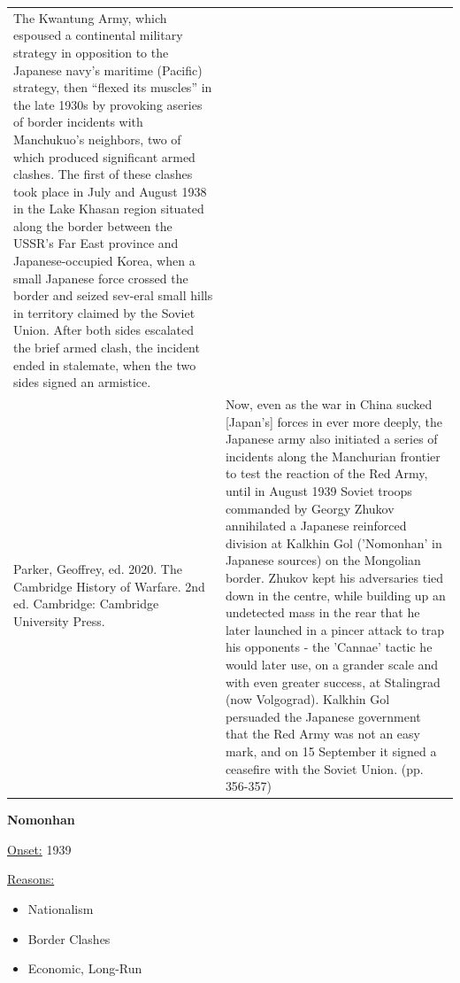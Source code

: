 {\begin{longtable}{p{}p{}}
The Kwantung Army, which espoused a continental military strategy in opposition to the Japanese navy's maritime (Pacific) strategy, then “flexed its muscles” in the late 1930s by provoking aseries of border incidents with Manchukuo's neighbors, two of which produced significant armed clashes. The first of these clashes took place in July and August 1938 in the Lake Khasan region situated along the border between the USSR's Far East province and Japanese-occupied Korea, when a small Japanese force crossed the border and seized sev-eral small hills in territory claimed by the Soviet Union. After both sides escalated the brief armed clash, the incident ended in stalemate, when the two sides signed an armistice.
\\
Parker, Geoffrey, ed. 2020. The Cambridge History of Warfare. 2nd ed. Cambridge: Cambridge University Press. & Now, even as the war in China sucked [Japan's] forces in ever more deeply, the Japanese army also initiated a series of incidents along the Manchurian frontier to test the reaction of the Red Army, until in August 1939 Soviet troops commanded by Georgy Zhukov annihilated a Japanese reinforced division at Kalkhin Gol ('Nomonhan' in Japanese sources) on the Mongolian border. Zhukov kept his adversaries tied down in the centre, while building up an undetected mass in the rear that he later launched in a pincer attack to trap his opponents - the 'Cannae' tactic he would later use, on a grander scale and with even greater success, at Stalingrad (now Volgograd). Kalkhin Gol persuaded the Japanese government that the Red Army was not an easy mark, and on 15 September it signed a ceasefire with the Soviet Union. (pp. 356-357)
\\
\end{longtable}}
\clearpage
         \textbf{Nomonhan} 

          \underline{Onset:} 1939         

\underline{Reasons:}
\begin{itemize}
\item Nationalism
\item Border Clashes
\item Economic, Long-Run
\end{itemize}

